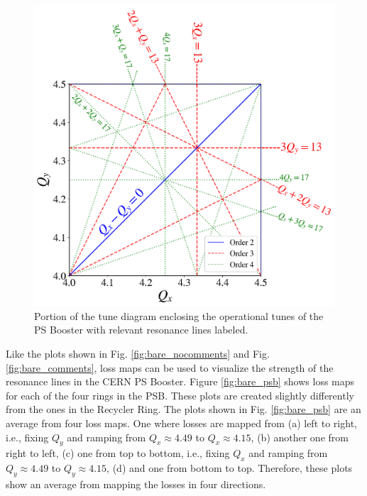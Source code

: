 \begin{figure}[H]
    \centering
    \includegraphics[width=\linewidth]{chapter5/psb_td.png}
    \caption{Portion of the tune diagram enclosing the operational tunes of the PS Booster with relevant resonance lines labeled.}
    \label{fig:psbtd}
\end{figure}

Like the plots shown in Fig. \ref{fig:bare_nocomments} and Fig. \ref{fig:bare_comments}, loss maps can be used to visualize the strength of the resonance lines in the CERN PS Booster. Figure \ref{fig:bare_psb} shows loss maps for each of the four rings in the PSB. These plots are created slightly differently from the ones in the Recycler Ring. The plots shown in Fig. \ref{fig:bare_psb} are an average from four loss maps. One where losses are mapped from (a) left to right, i.e., fixing $Q_y$ and ramping from $Q_x \approx 4.49$ to $Q_x \approx 4.15$, (b) another one from right to left, (c) one from top to bottom, i.e., fixing $Q_x$ and ramping from $Q_y \approx 4.49$ to $Q_y \approx 4.15$, (d) and one from bottom to top. Therefore, these plots show an average from mapping the losses in four directions.    

